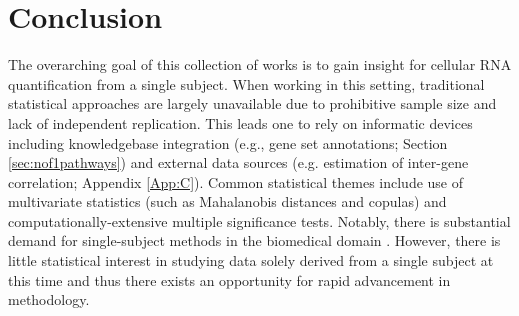 \chapter{Conclusion}\label{Chap:conclusion}



\indent\indent The overarching goal of this collection of works is to gain insight for cellular RNA quantification from a single subject. When working in this setting, traditional statistical approaches are largely unavailable due to prohibitive sample size and lack of independent replication. This leads one to rely on informatic devices including knowledgebase integration (e.g., gene set annotations; Section \ref{sec:nof1pathways}) and external data sources (e.g. estimation of inter-gene correlation; Appendix \ref{App:C}). Common statistical themes include use of multivariate statistics (such as Mahalanobis distances and copulas) and computationally-extensive multiple significance tests. Notably, there is substantial demand for single-subject methods in the biomedical domain \citep{Bacchetti2011}. However, there is little statistical interest in studying data solely derived from a single subject at this time and thus there exists an opportunity for rapid advancement in methodology.


